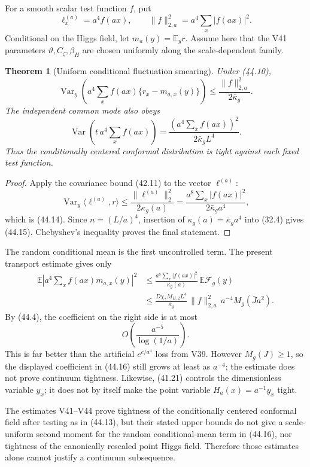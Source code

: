 \documentclass[11pt]{article}
\newtheorem{theorem}{Theorem}[section]
\theoremstyle{remark}
\begin{document}
For a smooth scalar test function \(f\), put
\[
 \ell_x^{(a)}=a^4f(ax),\qquad
 \|f\|_{2,a}^2=a^4\sum_x|f(ax)|^2.                \tag{44.13}
\]
Conditional on the Higgs field, let \(m_a(y)=\mathbb E_y r\).
Assume here that the V41 parameters
\(\vartheta,C_\zeta,\beta_H\) are chosen uniformly along the
scale-dependent family.

\begin{theorem}[Uniform conditional fluctuation smearing]
\label{thm:v17v44-smear}
Under (44.10),
\[
\boxed{
 \operatorname{Var}_y\left(
 a^4\sum_x f(ax)\{r_x-m_{a,x}(y)\}
 \right)
 \leq\frac{\|f\|_{2,a}^2}{2\bar\kappa_g}.}         \tag{44.14}
\]
The independent common mode also obeys
\[
 \operatorname{Var}\left(t\,a^4\sum_xf(ax)\right)
 =
 \frac{(a^4\sum_xf(ax))^2}
 {2\bar\kappa_gL^4}.                              \tag{44.15}
\]
Thus the conditionally centered conformal distribution is tight
against each fixed test function.
\end{theorem}

\begin{proof}
Apply the covariance bound (42.11) to the vector
\(\ell^{(a)}\):
\[
 \operatorname{Var}_y\langle\ell^{(a)},r\rangle
 \leq\frac{\|\ell^{(a)}\|_2^2}{2\kappa_g(a)}
 =\frac{a^8\sum_x|f(ax)|^2}{2\bar\kappa_ga^4},
\]
which is (44.14).  Since \(n=(L/a)^4\), insertion of
\(\kappa_g(a)=\bar\kappa_ga^4\) into (32.4) gives (44.15).
Chebyshev's inequality proves the final statement.
\end{proof}

The random conditional mean is the first uncontrolled term.  The
present transport estimate gives only
\[
\begin{aligned}
 \mathbb E\left|
 a^4\sum_xf(ax)m_{a,x}(y)\right|^2
 &\leq
 \frac{a^8\sum_x|f(ax)|^2}{\kappa_g(a)}
 \,\mathbb E\mathcal F_g(y)\\
 &\leq
 \frac{D\chi_*M_{H,2}L^4}{\bar\kappa_g}\,
 \|f\|_{2,a}^2\,a^{-4}M_g(\bar Ja^2).             \tag{44.16}
\end{aligned}
\]
By (44.4), the coefficient on the right side is at most
\[
 O\left(\frac{a^{-5}}{\log(1/a)}\right).           \tag{44.17}
\]
This is far better than the artificial \(e^{c/a^4}\) loss from V39.
However \(M_g(J)\geq1\), so the displayed coefficient in (44.16) still
grows at least as \(a^{-4}\); the estimate does not prove continuum
tightness.  Likewise, (41.21) controls the dimensionless variable
\(y_x\); it does not by itself make the point variable
\(H_a(x)=a^{-1}y_x\) tight.

\begin{countertheorem}
\label{ctr:v17v44-ledger}
The estimates V41--V44 prove tightness of the conditionally centered
conformal field after testing as in (44.13), but their stated upper
bounds do not give a scale-uniform second moment for the random
conditional-mean term in (44.16), nor tightness of the canonically
rescaled point Higgs field.  Therefore those estimates alone cannot
justify a continuum subsequence.
\end{countertheorem}
\end{document}
